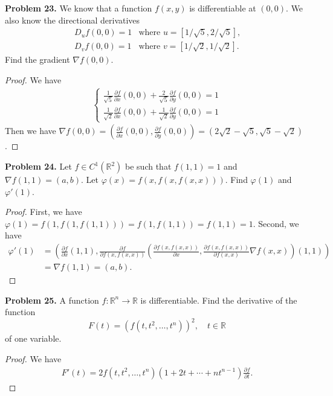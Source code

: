 \documentclass[12pt,leqno]{amsart}
\theoremstyle{definition}
\begin{document}
\medskip

\noindent
{\bf Problem 23.}
We know that a function $f(x,y)$ is differentiable at $(0,0)$. We also know the
directional derivatives
$$
\begin{array}{ccc}
D_uf(0,0)=1    & \mbox{where $u=[1/\sqrt{5},2/\sqrt{5}]$,}\\
D_vf(0,0)=1 &   \mbox{where $v=[1/\sqrt{2},1/\sqrt{2}]$}.
\end{array}
$$
Find the gradient $\nabla f(0,0)$.
\begin{proof}
We have 
\begin{align*}
    \left\{
    \begin{aligned}
        \frac{1}{\sqrt{5}}\frac{\partial f}{\partial x}(0,0) + \frac{2}{\sqrt{5}}\frac{\partial f}{\partial y}(0,0) = 1\\
        \frac{1}{\sqrt{2}}\frac{\partial f}{\partial x}(0,0) + \frac{1}{\sqrt{2}}\frac{\partial f}{\partial y}(0,0) = 1
    \end{aligned}
    \right.
\end{align*}
Then we have $\nabla f(0,0) = \left(\frac{\partial f}{\partial x}(0,0), \frac{\partial f}{\partial y}(0,0) \right) = \left(2\sqrt{2}-\sqrt{5}, \sqrt{5}-\sqrt{2} \right)$.
\end{proof}

\medskip

\noindent
{\bf Problem 24.}
Let $f\in C^1(\mathbb{R}^2)$ be such that $f(1,1)=1$ and $\nabla f(1,1)=(a,b)$.
Let $\varphi(x)=f(x,f(x,f(x,x)))$. Find $\varphi(1)$ and $\varphi'(1)$.
\begin{proof}
First, we have $\varphi(1) = f(1,f(1,f(1,1))) = f(1,f(1,1)) = f(1,1) = 1$. Second, we have
\begin{align*}
    \varphi'(1) & = \left(\frac{\partial f}{\partial x}(1,1), \frac{\partial f}{\partial f(x,f(x,x))} \left(\frac{\partial f(x,f(x,x))}{\partial x}, \frac{\partial f(x,f(x,x))}{\partial f(x,x)} \nabla f(x,x) \right)(1,1) \right) \\
    & = \nabla f(1,1)=(a,b).
\end{align*}
\end{proof}

\medskip

\noindent
{\bf Problem 25.}
A function $f:\mathbb{R}^n\to\mathbb{R}$ is differentiable. Find the derivative of the function
$$
F(t)=(f(t,t^2,\ldots,t^n))^2,\quad t\in\mathbb{R}
$$
of one variable.
\begin{proof}
We have
\begin{align*}
    F'(t) = 2 f(t,t^2,\ldots,t^n) (1 + 2t + \cdots + n t^{n-1}) \frac{\partial f}{\partial t}.
\end{align*}
\end{proof}
\end{document}
